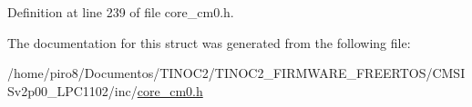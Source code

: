Definition at line 239 of file core\+\_\+cm0.\+h.



The documentation for this struct was generated from the following file\+:\begin{DoxyCompactItemize}
\item 
/home/piro8/\+Documentos/\+T\+I\+N\+O\+C2/\+T\+I\+N\+O\+C2\+\_\+\+F\+I\+R\+M\+W\+A\+R\+E\+\_\+\+F\+R\+E\+E\+R\+T\+O\+S/\+C\+M\+S\+I\+Sv2p00\+\_\+\+L\+P\+C1102/inc/\hyperlink{core__cm0_8h}{core\+\_\+cm0.\+h}\end{DoxyCompactItemize}

